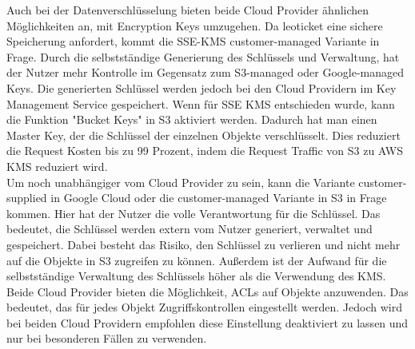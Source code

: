 Auch bei der Datenverschlüsselung bieten beide Cloud Provider ähnlichen Möglichkeiten an, mit Encryption Keys umzugehen. Da leoticket eine sichere Speicherung anfordert, kommt die SSE-KMS customer-managed Variante in Frage. Durch die selbstständige Generierung des Schlüssels und Verwaltung, hat der Nutzer mehr Kontrolle im Gegensatz zum S3-managed oder Google-managed Keys. Die generierten Schlüssel werden jedoch bei den Cloud Providern im Key Management Service gespeichert. Wenn für SSE KMS entschieden wurde, kann die Funktion "Bucket Keys" in S3 aktiviert werden. Dadurch hat man einen Master Key, der die Schlüssel der einzelnen Objekte verschlüsselt. Dies reduziert die Request Kosten bis zu 99 Prozent, indem die Request Traffic von S3 zu AWS KMS reduziert wird.\\

Um noch unabhängiger vom Cloud Provider zu sein, kann die Variante customer-supplied in Google Cloud oder die customer-managed Variante in S3 in Frage kommen. Hier hat der Nutzer die volle Verantwortung für die Schlüssel. Das bedeutet, die Schlüssel werden extern vom Nutzer generiert, verwaltet und gespeichert. Dabei besteht das Risiko, den Schlüssel zu verlieren und nicht mehr auf die Objekte in S3 zugreifen zu können. Außerdem ist der Aufwand für die selbstständige Verwaltung des Schlüssels höher als die Verwendung des KMS.\\

Beide Cloud Provider bieten die Möglichkeit, ACLs auf Objekte anzuwenden. Das bedeutet, das für jedes Objekt Zugriffskontrollen eingestellt werden. Jedoch wird bei beiden Cloud Providern empfohlen diese Einstellung deaktiviert zu lassen und nur bei besonderen Fällen zu verwenden.\\


